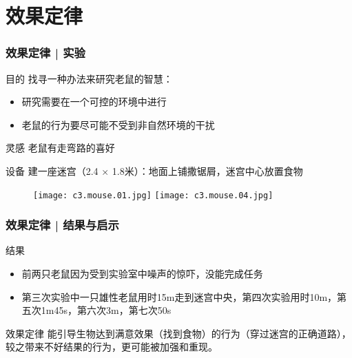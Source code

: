 \section{效果定律}
\begin{frame}
  \frametitle{效果定律 | 实验}
    \vspace{-0.5em}
  \begin{block}{目的}
    找寻一种办法来研究老鼠的智慧：
    \begin{itemize}
      \item 研究需要在一个可控的环境中进行
      \item 老鼠的行为要尽可能不受到非自然环境的干扰
    \end{itemize}
  \end{block}
    \vspace{-0.5em}
  \pause
  \begin{block}{灵感}
    老鼠有走弯路的喜好
  \end{block}
    \vspace{-0.5em}
  \pause
  \begin{block}{设备}
    建一座迷宫（2.4 $\times$ 1.8米）：地面上铺撒锯屑，迷宫中心放置食物
    \vspace{-1em}
    \begin{figure}
      \centering
      \texttt{[image: c3.mouse.01.jpg]}\quad
      \texttt{[image: c3.mouse.04.jpg]}
    \end{figure}
  \end{block}
\end{frame}

\begin{frame}
  \frametitle{效果定律 | 结果与启示}
  \begin{block}{结果}
    \begin{itemize}
      \item 前两只老鼠因为受到实验室中噪声的惊吓，没能完成任务
      \item 第三次实验中一只雄性老鼠用时15m走到迷宫中央，第四次实验用时10m，第五次1m45s，第六次3m，第七次50s
    \end{itemize}
  \end{block}
  \pause
  \begin{block}{效果定律}
    能引导生物达到满意效果（找到食物）的行为（穿过迷宫的正确道路），较之带来不好结果的行为，更可能被加强和重现。
  \end{block}
\end{frame}

